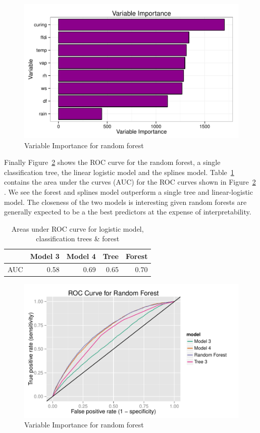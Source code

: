 \documentclass[11pt,a4paper]{article}
\begin{document}
\begin{figure}
  \centering
  	\includegraphics[width=1\columnwidth]{figures/varimp.pdf}
  \caption{Variable Importance for random forest}
  \label{fig:vimp}
\end{figure}

Finally Figure~\ref{fig:rocrf} shows the ROC curve for the random forest, a single classification tree, the linear logistic model and the splines model. Table~\ref{table:AUC} contains the area under the curves (AUC) for the ROC curves shown in Figure~\ref{fig:rocrf} . We see the forest and splines model outperform a single tree and linear-logistic model. The closeness of the two models is interesting given random forests are generally expected to be a the best predictors at the expense of interpretability.

\begin{table}
  \centering
  \begin{tabular}{r|rrrr}
    \toprule
        & Model 3 & Model 4 & Tree & Forest \\
    \midrule
    AUC & 0.58    & 0.69    & 0.65 & 0.70 \\
    \midrule
  \end{tabular}
  \caption{Areas under ROC curve for logistic model, classification trees \& forest}
  \label{table:AUC}
\end{table}

\begin{figure}
  \centering
	\includegraphics[width=1\columnwidth]{figures/roc_rf.pdf}
  \caption{Variable Importance for random forest}
  \label{fig:rocrf}
\end{figure}
\end{document}
